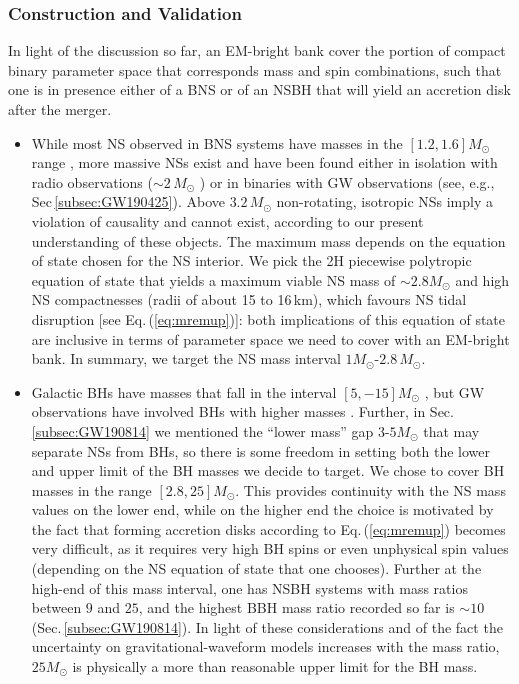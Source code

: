 \documentclass[binding=0.6cm, LaM]{sapthesis}
\begin{document}
\subsubsection{Construction and Validation}
	In light of the discussion so far, an EM-bright bank cover the portion of compact binary parameter space that
        corresponds mass and spin combinations, such that one is in presence either of a BNS or of an NSBH that will yield an accretion disk after the merger.
        \begin{itemize}
        \item While most NS observed in BNS systems have masses in the $[1.2, 1.6]M_{\odot}$ range \cite{87},
          more massive NSs exist and have been found either in isolation with radio observations ($\sim 2\,M_{\odot}$ \cite{87}) or in binaries with GW observations (see, e.g., Sec\,\ref{subsec:GW190425}).  Above $3.2\,M_\odot$ non-rotating, isotropic NSs imply a violation of causality and cannot exist, according to our present understanding of these objects.
          The maximum mass depends on the equation of state chosen for the NS interior.  We pick the 2H piecewise polytropic equation of state \cite{170} that yields a maximum viable NS mass of $\sim 2.8M_\odot$ and high NS compactnesses (radii of about 15 to 16\,km), which favours NS tidal disruption [see Eq.\,(\ref{eq:mremup})]: both implications of this equation of state are inclusive in terms of parameter space we need to cover with an EM-bright bank.
          In summary, we target the NS mass interval $1M_\odot$-$2.8\,M_\odot$.
        \item Galactic BHs have masses that fall in the interval $[5,-15]M_{\odot}$ \cite{124},
          but GW observations have involved BHs with higher masses \cite{49}.
          Further, in Sec.\,\ref{subsec:GW190814} we mentioned the ``lower mass'' gap $3$-$5M_\odot$ that may separate NSs from BHs, so there is some freedom in setting both the lower and upper limit of the BH masses we decide to target.
          We chose to cover BH masses in the range $[2.8,25]M_\odot$.
          This provides continuity with the NS mass values on the lower end, while on the higher end the choice is motivated by the fact that forming accretion disks according to Eq.\,(\ref{eq:mremup}) becomes very difficult, as it requires very high BH spins or even unphysical spin values (depending on the NS equation of state that one chooses).  Further at the high-end of this mass interval, one has NSBH systems with mass ratios between $9$ and $25$, and the highest BBH mass ratio recorded so far is $\sim 10$ (Sec.\,\ref{subsec:GW190814}).  In light of these considerations and of the fact the uncertainty on gravitational-waveform models increases with the mass ratio, $25M_\odot$ is physically a more than reasonable upper limit for the BH mass.

\end{itemize}
\end{document}
